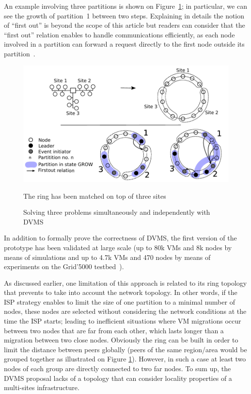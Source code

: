 An example involving three partitions is shown on Figure~\ref{fig:isp}; in
particular, we can see the growth of partition~1 between two steps. 
Explaining in details the notion of ``first out'' is beyond the scope of this article but readers can consider that the ``first out'' relation enables
to handle communications efficiently, as each node involved in a partition
can forward a request directly to the first node outside its partition~\cite{quesnel:cpe2012}.
\begin{figure}[h!]
  \centering
  \includegraphics[width=0.9\linewidth]{Figures/resourceAcquisition-standard.pdf}
  \caption{Solving three problems simultaneously and independently with DVMS}%
\small{The ring has been matched on top of three sites}
  \label{fig:isp}%
\end{figure}

In addition to formally prove the correctness of DVMS, the first version of the prototype
has been validated at large scale (up to 80k VMs and 8k nodes by means of simulations and up to 4.7k VMs and 470 nodes by means of experiments on the Grid'5000
testbed~\cite{quesnel:ispa2013}).

As discussed earlier, one limitation of this approach is related to its ring topology that prevents to take into account the network topology. 
%
%
%
In other words, if the ISP strategy enables to limit the size of one partition to a minimal number of nodes, these nodes are selected without considering 
the network conditions at the time the ISP starts; leading to inefficient situations where VM migrations occur between two nodes that are far from each other, 
which lasts longer than a migration between two close nodes. Obviously the ring can
be built in order to limit the distance between peers globally (\ie peers of
the same region/area would be grouped together as illustrated on Figure \ref{fig:isp}). However, in such a case at least two nodes of each group are directly connected to 
two far nodes. 
%
To sum up, the DVMS proposal lacks of a topology that can consider locality properties of a multi-sites infrastructure. 

